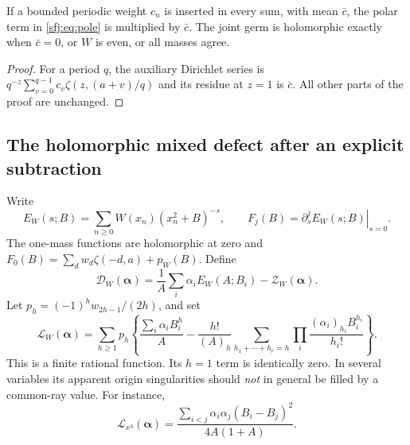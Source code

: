 \begin{corollary}
If a bounded periodic weight $c_n$ is inserted in every sum, with
mean $\bar c$, the polar term in \eqref{sfj:eq:pole} is multiplied
by $\bar c$.  The joint germ is holomorphic exactly when
$\bar c=0$, or $W$ is even, or all masses agree.
\end{corollary}
\begin{proof}
For a period $q$, the auxiliary Dirichlet series is
$q^{-z}\sum_{v=0}^{q-1}c_v\zeta(z,(a+v)/q)$ and its residue at
$z=1$ is $\bar c$.  All other parts of the proof are unchanged.
\end{proof}

\subsection{The holomorphic mixed defect after an explicit subtraction}

Write
\[
 E_W(s;B)=\sum_{n\ge0}W(x_n)(x_n^2+B)^{-s},\qquad
 F_j(B)=\left.\partial_s^jE_W(s;B)\right|_{s=0}.
\]
The one-mass functions are holomorphic at zero and
$F_0(B)=\sum_dw_d\zeta(-d,a)+p_W(B)$.  Define
\begin{equation}\label{sfj:eq:joint-defect}
 \mathscr D_W(\boldsymbol\alpha)
   =\frac1A\sum_i\alpha_iE_W(A;B_i)
                           -\mathscr Z_W(\boldsymbol\alpha).
\end{equation}
Let $p_h=(-1)^hw_{2h-1}/(2h)$, and set
\begin{equation}\label{sfj:eq:joint-local}
 \mathscr L_W(\boldsymbol\alpha)
  =\sum_{h\ge1}p_h\left\{
    \frac{\sum_i\alpha_iB_i^h}{A}
    -\frac{h!}{(A)_h}
       \sum_{h_1+\cdots+h_r=h}
          \prod_i\frac{(\alpha_i)_{h_i}B_i^{h_i}}{h_i!}
                         \right\}.
\end{equation}
This is a finite rational function.  Its $h=1$ term is identically
zero.  In several variables its apparent origin singularities should
\emph{not} in general be filled by a common-ray value.  For instance,
\begin{equation}\label{sfj:eq:joint-local-cubic}
 \mathscr L_{x^3}(\boldsymbol\alpha)
   =\frac{\sum_{i<j}\alpha_i\alpha_j(B_i-B_j)^2}{4A(1+A)}.
\end{equation}

